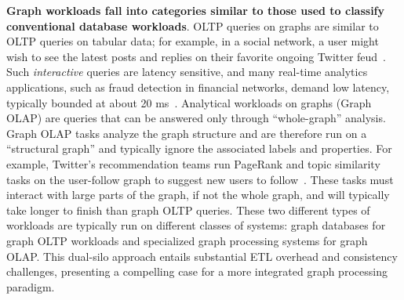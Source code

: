 \textbf{Graph workloads fall into categories similar to those used to classify conventional database workloads}.
OLTP queries on graphs are similar to OLTP queries on tabular data; for example, in a social network, a user might wish to see the latest posts and replies on their favorite ongoing Twitter feud~\cite{AholeMusk:online}.
Such \emph{interactive} queries are latency sensitive, and many real-time analytics applications, such as fraud detection in financial networks, demand low latency, typically bounded at about 20 ms~\cite{qiu2018real}.
Analytical workloads on graphs (Graph OLAP) are queries that can be answered only through ``whole-graph'' analysis.
Graph OLAP tasks analyze the graph structure and are therefore run on a ``structural graph'' and typically ignore the associated labels and properties.
For example, Twitter's recommendation teams run PageRank and topic similarity tasks on the user-follow graph to suggest new users to follow~\cite{tang2022taming}.
These tasks must interact with large parts of the graph, if not the whole graph, and will typically take longer to finish than graph OLTP queries.
These two different types of workloads are typically run on different classes of systems: graph databases for graph OLTP workloads and specialized graph processing systems for graph OLAP.
This dual-silo approach entails substantial ETL overhead and consistency challenges, presenting a compelling case for a more integrated graph processing paradigm.


